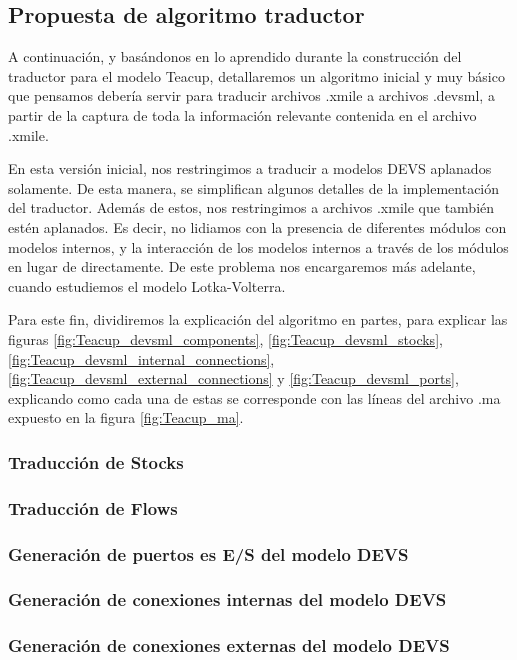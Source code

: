 \subsection{Propuesta de algoritmo traductor}
A continuación, y basándonos en lo aprendido durante la construcción del traductor para el modelo Teacup, detallaremos un algoritmo inicial y muy básico que pensamos debería servir para traducir archivos .xmile a archivos .devsml, a partir de la captura de toda la información relevante contenida en el archivo .xmile.

En esta versión inicial, nos restringimos a traducir a modelos DEVS aplanados solamente. De esta manera, se simplifican algunos detalles de la implementación del traductor. Además de estos, nos restringimos a archivos .xmile que también estén aplanados. Es decir, no lidiamos con la presencia de diferentes módulos con modelos internos, y la interacción de los modelos internos a través de los módulos en lugar de directamente. De este problema nos encargaremos más adelante, cuando estudiemos el modelo Lotka-Volterra.

Para este fin, dividiremos la explicación del algoritmo en partes, para explicar las figuras \ref{fig:Teacup_devsml_components}, \ref{fig:Teacup_devsml_stocks}, \ref{fig:Teacup_devsml_internal_connections}, \ref{fig:Teacup_devsml_external_connections} y \ref{fig:Teacup_devsml_ports}, explicando como cada una de estas se corresponde con las líneas del archivo .ma expuesto en la figura \ref{fig:Teacup_ma}.

\subsubsection{Traducción de \textbf{Stocks}}
\subsubsection{Traducción de \textbf{Flows}}
\subsubsection{Generación de puertos es E/S del modelo DEVS}
\subsubsection{Generación de conexiones internas del modelo DEVS}
\subsubsection{Generación de conexiones externas del modelo DEVS}

